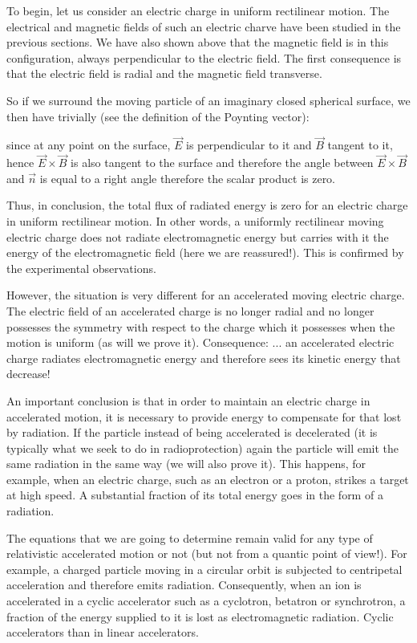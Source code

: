 	To begin, let us consider an electric charge in uniform rectilinear motion. The electrical and magnetic fields of such an electric charve have been studied in the previous sections. We have also shown above that the magnetic field is in this configuration, always perpendicular to the electric field. The first consequence is that the electric field is radial and the magnetic field transverse.

	So if we surround the moving particle of an imaginary closed spherical surface, we then have trivially (see the definition of the Poynting vector):
	
	since at any point on the surface, $\vec{E}$ is perpendicular to it and $\vec{B}$ tangent to it, hence $\vec{E}\times\vec{B}$ is also tangent to the surface and therefore the angle between $\vec{E}\times\vec{B}$ and $\vec{n}$ is equal to a right angle therefore the scalar product is zero.

	Thus, in conclusion, the total flux of radiated energy is zero for an electric charge in uniform rectilinear motion. In other words, a uniformly rectilinear moving electric charge does not radiate electromagnetic energy but carries with it the energy of the electromagnetic field (here we are reassured!). This is confirmed by the experimental observations.

	However, the situation is very different for an accelerated moving electric charge. The electric field of an accelerated charge is no longer radial and no longer possesses the symmetry with respect to the charge which it possesses when the motion is uniform (as will we prove it). Consequence: ... an accelerated electric charge radiates electromagnetic energy and therefore sees its kinetic energy that decrease!

	An important conclusion is that in order to maintain an electric charge in accelerated motion, it is necessary to provide energy to compensate for that lost by radiation. If the particle instead of being accelerated is decelerated (it is typically what we seek to do in radioprotection) again the particle will emit the same radiation in the same way (we will also prove it). This happens, for example, when an electric charge, such as an electron or a proton, strikes a target at high speed. A substantial fraction of its total energy goes in the form of a radiation.

	The equations that we are going to determine remain valid for any type of relativistic accelerated motion or not (but not from a quantic point of view!). For example, a charged particle moving in a circular orbit is subjected to centripetal acceleration and therefore emits radiation. Consequently, when an ion is accelerated in a cyclic accelerator such as a cyclotron, betatron or synchrotron, a fraction of the energy supplied to it is lost as electromagnetic radiation. Cyclic accelerators than in linear accelerators.
	
